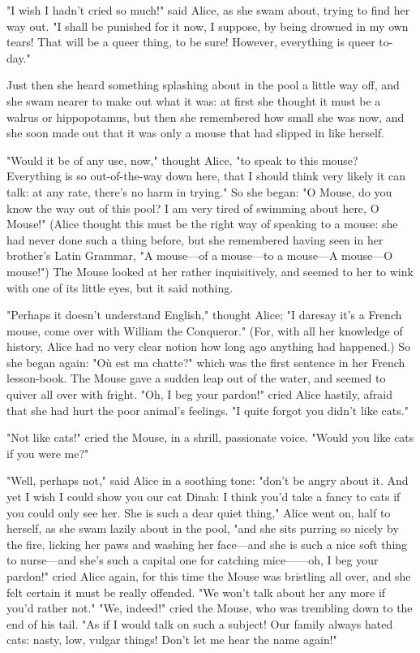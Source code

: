 "I wish I hadn't cried so much!" said Alice, as she swam about, trying to find her way out. ​"I shall be punished for it now, I suppose, by being drowned in my own tears! That will be a queer thing, to be sure! However, everything is queer to-day."

Just then she heard something splashing about in the pool a little way off, and she swam nearer to make out what it was: at first she thought it must be a walrus or hippopotamus, but then she remembered how small she was now, and she soon made out that it was only a mouse that had slipped in like herself.

"Would it be of any use, now," thought Alice, "to speak to this mouse? Everything is so out-of-the-way down here, that I should think very likely it can talk: at any rate, there's no harm in trying." So she began: "O Mouse, do you know the way out of this pool? I am very tired of swimming about here, O Mouse!" (Alice thought this must be the right way of speaking to a mouse: she had never done such a thing before, but she remembered having seen in her brother's Latin Grammar, "A ​mouse—of a mouse—to a mouse—A mouse—O mouse!") The Mouse looked at her rather inquisitively, and seemed to her to wink with one of its little eyes, but it said nothing.

"Perhaps it doesn't understand English," thought Alice; "I daresay it's a French mouse, come over with William the Conqueror." (For, with all her knowledge of history, Alice had no very clear notion how long ago anything had happened.) So she began again: "Où est ma chatte?" which was the first sentence in her French lesson-book. The Mouse gave a sudden leap out of the water, and seemed to quiver all over with fright. "Oh, I beg your pardon!" cried Alice hastily, afraid that she had hurt the poor animal's feelings. "I quite forgot you didn't like cats."

"Not like cats!" cried the Mouse, in a shrill, passionate voice. "Would you like cats if you were me?"

"Well, perhaps not," said Alice in a soothing tone: "don't be angry about it. And yet ​I wish I could show you our cat Dinah: I think you'd take a fancy to cats if you could only see her. She is such a dear quiet thing," Alice went on, half to herself, as she swam lazily
about in the pool, "and she sits purring so nicely by the fire, licking her paws and washing her face—and she is such a nice soft thing to nurse—and she's such a capital one for catching mice——oh, I beg your pardon!" cried Alice again, for this time the Mouse was bristling all over, and she felt certain it must be really ​offended. "We won't talk about her any more if you'd rather not."
"We, indeed!" cried the Mouse, who was trembling down to the end of his tail. "As if I would talk on such a subject! Our family always hated cats: nasty, low, vulgar things! Don't let me hear the name again!"

